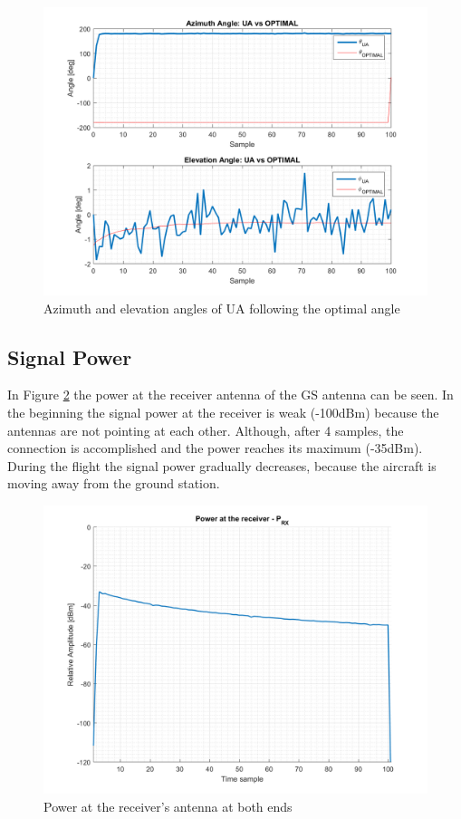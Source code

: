\begin{figure}[H]
	\centering
	\includegraphics[scale=0.75]{figures/s2_ua.png}
	\caption{Azimuth and elevation angles of UA following the optimal angle}
	\label{fig:s2_ua}
\end{figure}


\subsection*{Signal Power}
In Figure \ref{fig:s2_power} the power at the receiver antenna of the GS antenna can be seen. In the beginning the signal power at the receiver is weak (-100dBm) because the antennas are not pointing at each other. Although, after 4 samples, the connection is accomplished and the power reaches its maximum (-35dBm). During the flight the signal power gradually decreases, because the aircraft is moving away from the ground station. 

\begin{figure}[H]
	\centering
	\includegraphics[scale=0.75]{figures/s2_power.png}
	\caption{Power at the receiver's antenna at both ends}
	\label{fig:s2_power}
\end{figure}

